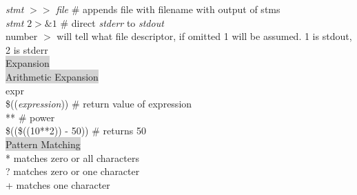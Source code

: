\documentclass[1pt]{proc}
\begin{document}
\begin{landscape}
\begin{multicols}{3}
\textit{stmt} $>>$ \textit{file} \# appends file with filename with output of stms\\
\textit{stmt} $2>\&1$ \# direct \textit{stderr} to \textit{stdout}\\
number $>$ will tell what file descriptor, if omitted 1 will be assumed. 1 is stdout, 2 is stderr  \\
\colorbox{lightgray}{Expansion}\\
\colorbox{lightgray}{Arithmetic Expansion}\\
expr \\
\$((\textit{expression})) \# return value of expression\\
** \# power\\
\$((\$((10**2)) - 50)) \# returns 50\\
\colorbox{lightgray}{Pattern Matching}\\
* matches zero or all characters\\
? matches zero or one character\\
+ matches one character\\
\end{multicols}
\end{landscape}
\end{document}
